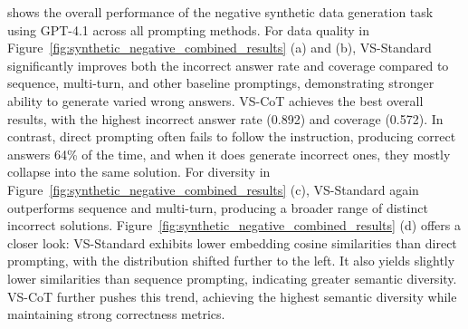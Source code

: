  shows the overall performance of the negative synthetic data generation task using GPT-4.1 across all prompting methods.
For data quality in Figure~\ref{fig:synthetic_negative_combined_results} (a) and (b), VS-Standard significantly improves both the incorrect answer rate and coverage compared to sequence, multi-turn, and other baseline promptings, demonstrating stronger ability to generate varied wrong answers. VS-CoT achieves the best overall results, with the highest incorrect answer rate (0.892) and coverage (0.572). In contrast, direct prompting often fails to follow the instruction, producing correct answers 64\% of the time, and when it does generate incorrect ones, they mostly collapse into the same solution.
For diversity in Figure~\ref{fig:synthetic_negative_combined_results} (c), VS-Standard again outperforms sequence and multi-turn, producing a broader range of distinct incorrect solutions. Figure~\ref{fig:synthetic_negative_combined_results} (d) offers a closer look: VS-Standard exhibits lower embedding cosine similarities than direct prompting, with the distribution shifted further to the left. It also yields slightly lower similarities than sequence prompting, indicating greater semantic diversity. VS-CoT further pushes this trend, achieving the highest semantic diversity while maintaining strong correctness metrics.

